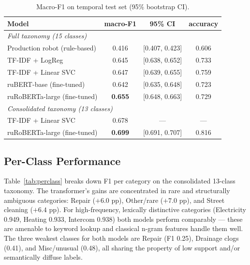 \documentclass[11pt]{article}
\begin{document}
\begin{table}[h]\centering
\caption{Macro-F1 on temporal test set (95\% bootstrap CI).}
\label{tab:main}
\begin{tabular}{lccc}
\toprule
Model & macro-F1 & 95\% CI & accuracy \\
\midrule
\multicolumn{4}{l}{\emph{Full taxonomy (15 classes)}}\\
Production robot (rule-based) & 0.416 & [0.407, 0.423] & 0.606 \\
TF-IDF + LogReg               & 0.645 & [0.638, 0.652] & 0.733 \\
TF-IDF + Linear SVC           & 0.647 & [0.639, 0.655] & 0.759 \\
ruBERT-base (fine-tuned)      & 0.642 & [0.635, 0.648] & 0.723 \\
ruRoBERTa-large (fine-tuned)  & \textbf{0.655} & [0.648, 0.663] & 0.729 \\
\midrule
\multicolumn{4}{l}{\emph{Consolidated taxonomy (13 classes)}}\\
TF-IDF + Linear SVC           & 0.678 & --- & --- \\
ruRoBERTa-large (fine-tuned)  & \textbf{0.699} & [0.691, 0.707] & 0.816 \\
\bottomrule
\end{tabular}
\end{table}

\subsection{Per-Class Performance}

Table~\ref{tab:perclass} breaks down F1 per category on the consolidated
13-class taxonomy. The transformer's gains are concentrated in rare and
structurally ambiguous categories: Repair ($+6.0$ pp), Other/rare ($+7.0$ pp),
and Street cleaning ($+6.4$ pp). For high-frequency, lexically distinctive
categories (Electricity 0.949, Heating 0.933, Intercom 0.938) both models
perform comparably --- these are amenable to keyword lookup and classical
n-gram features handle them well. The three weakest classes for both models
are Repair (F1 0.25), Drainage clogs (0.41), and Misc/unusual (0.48),
all sharing the property of low support and/or semantically diffuse labels.
\end{document}
